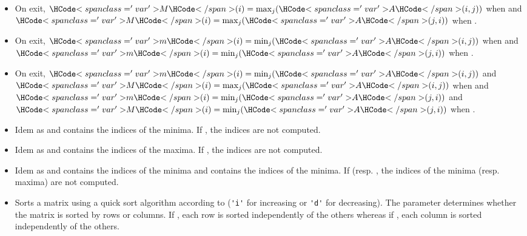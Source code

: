 \begin{itemize}
\item {}
  \sshortdescribe On exit, $\var{M}(i) = \max_{j}(\var{A}(i, j))$ when 
  and $\var{M}(i) = \max_{j}(\var{A}(j, i))$ when .

\item {}
  \sshortdescribe On exit, $\var{m}(i) = \min_{j}(\var{A}(i, j))$ when 
  and $\var{m}(i) = \min_{j}(\var{A}(j, i))$ when .

\item {}
  \sshortdescribe On exit, $\var{m}(i) = \min_{j}(\var{A}(i, j))$ and $\var{M}(i) =
  \max_{j}(\var{A}(i, j))$ when  and $\var{m}(i) = \min_{j}(\var{A}(j, i))$
  and $\var{M}(i) = \min_{j}(\var{A}(j, i))$ when .
  
\item {}
  \sshortdescribe Idem as  and  contains the
  indices of the minima. If , the indices are not computed.

\item {}
  \sshortdescribe Idem as  and  contains the
  indices of the maxima. If , the indices are not computed.

\item {}
  \sshortdescribe Idem as  and  contains the
  indices of the minima and  contains the indices of the minima. If
   (resp. , the indices of the minima
  (resp. maxima) are not computed.

\item {}
  \sshortdescribe Sorts a matrix using a quick sort algorithm according to
   (\verb!'i'! for increasing or \verb!'d'! for decreasing). The parameter  determines
  whether the matrix is sorted by rows or columns. If , each row
  is sorted independently of the others whereas if , each column
  is sorted independently of the others.


\end{itemize}
